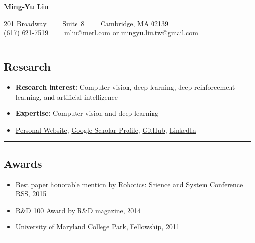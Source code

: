 \documentclass[10pt,letterpaper]{article}
\begin{document}
\begin{center}
{\LARGE \textbf{Ming-Yu Liu}}

201 Broadway\ \ \textbullet
\ \ Suite\ 8\ \ \textbullet
\ \ Cambridge, MA 02139
\\
(617) 621-7519\ \ \textbullet
\ \ mliu@merl.com or mingyu.liu.tw@gmail.com
\end{center}

\hrule
\vspace{-0.4em}
\subsection*{Research}
\begin{itemize}
\item {\bf Research interest:} Computer vision, deep learning, deep reinforcement learning, and artificial intelligence\vspace{-2mm}
\item {\bf Expertise:} Computer vision and deep learning\vspace{-2mm}
\item \href{http://mingyuliu.net/}{Personal Website}, \href{https://scholar.google.com/citations?hl=en&user=y-f-MZgAAAAJ&cstart=20&pagesize=20}{Google Scholar Profile},  \href{https://github.com/mingyuliutw}{GitHub}, \href{https://www.linkedin.com/in/mingyuliu}{LinkedIn}
\end{itemize}

\hrule
\vspace{-0.4em}
\subsection*{Awards}
\begin{itemize}
\item Best paper honorable mention by Robotics: Science and System Conference RSS, 2015\vspace{-2mm}
\item R\&D 100 Award by R\&D magazine, 2014\vspace{-2mm}
\item University of Maryland College Park, Fellowship, 2011
\end{itemize}

\hrule
\vspace{-0.4em}
\end{document}
